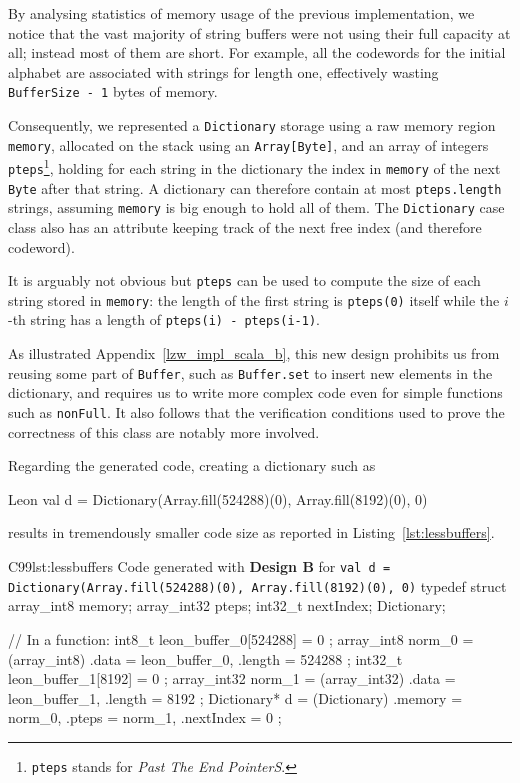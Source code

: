 \documentclass[a4paper,twoside]{article}
\newcommand{\InlineS}[1]{\lstinline[language=Leon]|#1|}
\newcommand{\RefApp}[1]{Appendix~\ref{#1}}
\newcommand{\RefCode}[1]{Listing~\ref{#1}}
\begin{document}
By analysing statistics of memory usage of the previous implementation, we
notice that the vast majority of string buffers were not using their full
capacity at all; instead most of them are short. For example, all the codewords
for the initial alphabet are associated with strings for length one, effectively
wasting \InlineS{BufferSize - 1} bytes of memory.

Consequently, we represented a \InlineS{Dictionary} storage using a raw memory
region \InlineS{memory}, allocated on the stack using an \InlineS{Array[Byte]},
and an array of integers \InlineS{pteps}\footnote{\InlineS{pteps} stands for
\emph{Past The End PointerS}.}, holding for each string in the dictionary the
index in \InlineS{memory} of the next \InlineS{Byte} after that string. A
dictionary can therefore contain at most \InlineS{pteps.length} strings,
assuming \InlineS{memory} is big enough to hold all of them. The
\InlineS{Dictionary} case class also has an attribute keeping track of the next
free index (and therefore codeword).

It is arguably not obvious but \InlineS{pteps} can be used to compute the size
of each string stored in \InlineS{memory}: the length of the first string is
\InlineS{pteps(0)} itself while the $i$-th string has a length of
\InlineS{pteps(i) - pteps(i-1)}.

As illustrated \RefApp{lzw_impl_scala_b}, this new design prohibits us from
reusing some part of \InlineS{Buffer}, such as \InlineS{Buffer.set} to insert
new elements in the dictionary, and requires us to write more complex code even
for simple functions such as \InlineS{nonFull}. It also follows that the
verification conditions used to prove the correctness of this class are notably
more involved.

Regarding the generated code, creating a dictionary such as
\begin{ShortCode}{Leon}
val d = Dictionary(Array.fill(524288)(0), Array.fill(8192)(0), 0)
\end{ShortCode}
results in tremendously smaller code size as reported in
\RefCode{lst:lessbuffers}.

\begin{Code}{C99}{lst:lessbuffers}{%
Code generated with \textbf{Design B} for %
\InlineS{val d = Dictionary(Array.fill(524288)(0), Array.fill(8192)(0), 0)}}
typedef struct { array_int8 memory; array_int32 pteps; int32_t nextIndex; }
        Dictionary;

// In a function:
int8_t leon_buffer_0[524288] = { 0 };
array_int8 norm_0 = (array_int8) { .data = leon_buffer_0, .length = 524288 };
int32_t leon_buffer_1[8192] = { 0 };
array_int32 norm_1 = (array_int32) { .data = leon_buffer_1, .length = 8192 };
Dictionary* d =
    (Dictionary) { .memory = norm_0, .pteps = norm_1, .nextIndex = 0 };
\end{Code}
\end{document}
